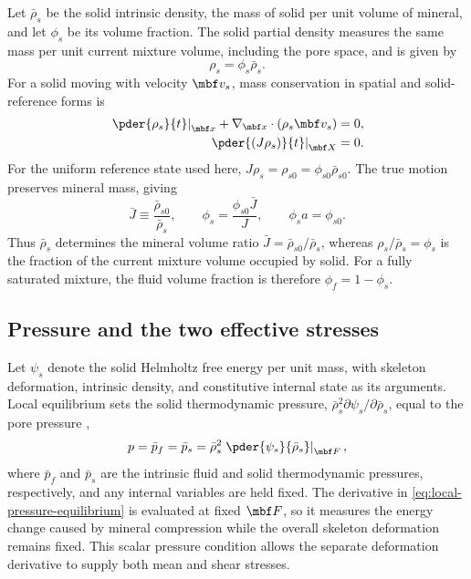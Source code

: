 Let \(\bar\rho_s\) be the solid intrinsic density, the mass of solid per
unit volume of mineral, and let \(\phi_s\) be its volume fraction.  The
solid partial density measures the same mass per unit current mixture
volume, including the pore space, and is given by
\begin{equation*}
 \rho_s=\phi_s\bar\rho_s.
\end{equation*}
For a solid moving with velocity \(\mbf v_s\), mass conservation
in spatial and solid-reference forms is
\begin{align*}
 \left.\pder{\rho_s}{t}\right|_{\mbf x}
 +\nabla_{\mbf x}\mathbin{\cdot}(\rho_s\mbf v_s)&=0,
\\
 \left.\pder{(J\rho_s)}{t}\right|_{\mbf X}&=0.
\end{align*}
For the uniform reference state used here,
\(J\rho_s=\rho_{s0}=\phi_{s0}\bar\rho_{s0}\).  The true motion preserves
mineral mass, giving
\begin{equation}
 \bar J\equiv\frac{\bar\rho_{s0}}{\bar\rho_s},
 \qquad \phi_s=\frac{\phi_{s0}\bar J}{J},
 \qquad \phi_s a=\phi_{s0}.
 \label{eq:distension}
\end{equation}
Thus \(\bar\rho_s\) determines the mineral volume ratio
\(\bar J=\bar\rho_{s0}/\bar\rho_s\), whereas
\(\rho_s/\bar\rho_s=\phi_s\) is the fraction of the current mixture volume
occupied by solid.  For a fully saturated mixture, the fluid volume fraction
is therefore \(\phi_f=1-\phi_s\).

\subsection{Pressure and the two effective stresses}
\label{sec:intrinsic-pressure}

Let \(\psi_s\) denote the solid Helmholtz free energy per unit mass, with skeleton
deformation, intrinsic density, and constitutive internal state as its
arguments.  Local equilibrium sets the solid thermodynamic pressure,
\(\bar\rho_s^2\partial\psi_s/\partial\bar\rho_s\), equal to the pore pressure
\citep[eq.~(27c)]{fosterxu2025},
\begin{equation}
 p=\bar p_f=\bar p_s
 =\bar\rho_s^2\left.\pder{\psi_s}{\bar\rho_s}\right|_{\mbf F},
 \label{eq:local-pressure-equilibrium}
\end{equation}
where \(\bar p_f\) and \(\bar p_s\) are the intrinsic fluid and solid
thermodynamic pressures, respectively, and any internal variables are held
fixed.  The derivative in \eqref{eq:local-pressure-equilibrium} is evaluated
at fixed \(\mbf F\), so it measures the energy change caused by mineral
compression while the
overall skeleton deformation remains fixed.  This scalar pressure condition
allows the separate deformation derivative to supply both mean and shear
stresses.

